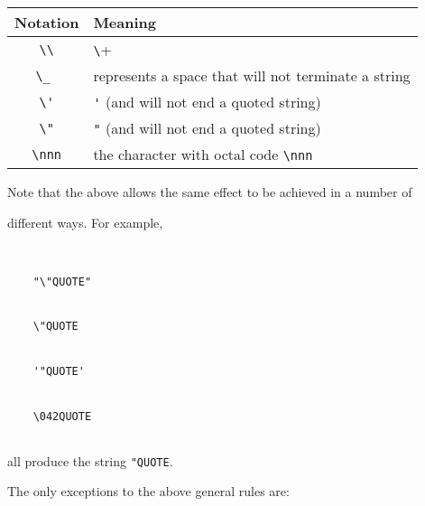 \begin{center}


\begin{tabular}{|c|l|} \hline


Notation   & Meaning \\ \hline


\verb+\\+   & \verb+\+ \\ \hline


\verb+\_ +  & represents a space that will not terminate a string \\ \hline


\verb+\'+   & \verb+'+  (and will not end a quoted string) \\ \hline


\verb+\"+   & \verb+"+ (and will not end a quoted string) \\ \hline


\verb+\nnn+ & the character with octal code \verb+\nnn+ \\ \hline


\end{tabular}


\end{center}





\noindent{}


Note that the above allows the same effect to be achieved in a number of 


different ways.  For example,


\begin{verbatim}


    "\"QUOTE" 


    \"QUOTE 


    '"QUOTE' 


    \042QUOTE 


\end{verbatim}


all produce the string \verb+"QUOTE+.





The only exceptions to the above general rules are:


